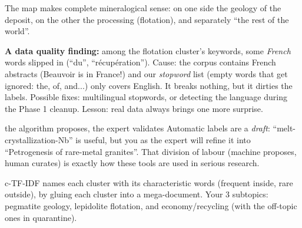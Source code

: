 \documentclass[11pt,a4paper]{article}
\begin{document}
The map makes complete mineralogical sense: on one side the geology of the deposit, on the
other the processing (flotation), and separately ``the rest of the world''.

\begin{ojo}
\textbf{A data quality finding:} among the flotation cluster's keywords, some \emph{French}
words slipped in (``du'', ``récupération''). Cause: the corpus contains French abstracts
(Beauvoir is in France!) and our \emph{stopword} list (empty words that get ignored: the, of,
and...) only covers English. It breaks nothing, but it dirties the labels. Possible fixes:
multilingual stopwords, or detecting the language during the Phase 1 cleanup. Lesson: real
data always brings one more surprise.
\end{ojo}

\begin{concepto}{the algorithm proposes, the expert validates}
Automatic labels are a \emph{draft}: ``melt-crystallization-Nb'' is useful, but you as the
expert will refine it into ``Petrogenesis of rare-metal granites''. That division of labour
(machine proposes, human curates) is exactly how these tools are used in serious research.
\end{concepto}

\begin{resumen}
c-TF-IDF names each cluster with its characteristic words (frequent inside, rare outside), by
gluing each cluster into a mega-document. Your 3 subtopics: pegmatite geology, lepidolite
flotation, and economy/recycling (with the off-topic ones in quarantine).
\end{resumen}
\end{document}
